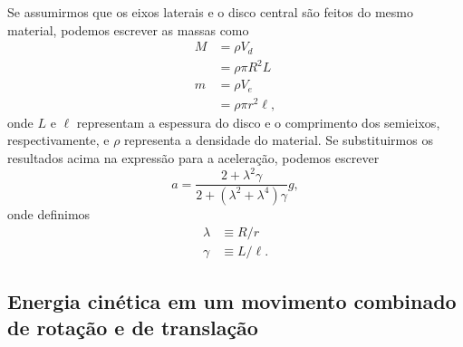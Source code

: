 Se assumirmos que os eixos laterais e o disco central são feitos do mesmo material, podemos escrever as massas como
\begin{align}
    M &= \rho V_d \\
    &= \rho \pi R^2 L \\
    m &= \rho V_e \\
    &= \rho \pi r^2 \ell,
\end{align}
%
onde $L$ e $\ell$ representam a espessura do disco e o comprimento dos semieixos, respectivamente, e $\rho$ representa a densidade do material. Se substituirmos os resultados acima na expressão para a aceleração, podemos escrever
\begin{equation}
    a = \frac{2 + \lambda^2\gamma}{2 + (\lambda^2 + \lambda^4) \gamma} g,
\end{equation}
%
onde definimos
\begin{align}
    \lambda &\equiv R/r \\
    \gamma &\equiv L/\ell.
\end{align}

\subsection{Energia cinética em um movimento combinado de rotação e de translação}

